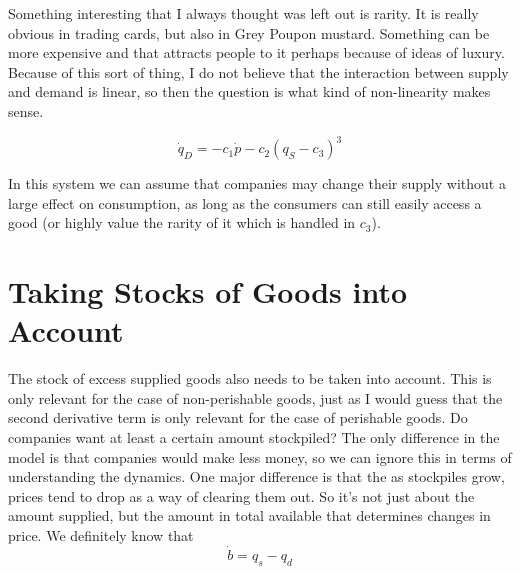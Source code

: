 \documentclass{article}
\begin{document}
Something interesting that I always thought was left out is rarity. It is really obvious in trading cards, but also in Grey Poupon mustard. Something can be more expensive and that attracts people to it perhaps because of ideas of luxury. Because of this sort of thing, I do not believe that the interaction between supply and demand is linear, so then the question is what kind of non-linearity makes sense. 

\begin{equation}
		\dot{q}_D = - c_1 \dot{p} - c_2(q_S-c_3)^3
\end{equation}

In this system we can assume that companies may change their supply without a large effect on consumption, as long as the consumers can still easily access a good (or highly value the rarity of it which is handled in $c_3$).



\section{Taking Stocks of Goods into Account}
The stock of excess supplied goods also needs to be taken into account. This is only relevant for the case of non-perishable goods, just as I would guess that the second derivative term is only relevant for the case of perishable goods. Do companies want at least a certain amount stockpiled? The only difference in the model is that companies would make less money, so we can ignore this in terms of understanding the dynamics. One major difference is that the as stockpiles grow, prices tend to drop as a way of clearing them out. So it's not just about the amount supplied, but the amount in total available that determines changes in price. We definitely know that 
\begin{equation*}
	\dot{b} = q_s - q_d
\end{equation*}



\end{document}
